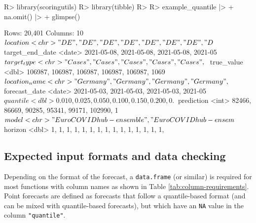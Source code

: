 \documentclass[
]{jss}
\begin{document}
\begin{CodeChunk}
\begin{CodeInput}
R> library(scoringutils)
R> library(tibble) 
R> 
R> example_quantile |>
+   na.omit() |>
+   glimpse()
\end{CodeInput}
\begin{CodeOutput}
Rows: 20,401
Columns: 10
$ location        <chr> "DE", "DE", "DE", "DE", "DE", "DE", "DE", "D~
$ target_end_date <date> 2021-05-08, 2021-05-08, 2021-05-08, 2021-05~
$ target_type     <chr> "Cases", "Cases", "Cases", "Cases", "Cases",~
$ true_value      <dbl> 106987, 106987, 106987, 106987, 106987, 1069~
$ location_name   <chr> "Germany", "Germany", "Germany", "Germany", ~
$ forecast_date   <date> 2021-05-03, 2021-05-03, 2021-05-03, 2021-05~
$ quantile        <dbl> 0.010, 0.025, 0.050, 0.100, 0.150, 0.200, 0.~
$ prediction      <int> 82466, 86669, 90285, 95341, 99171, 102990, 1~
$ model           <chr> "EuroCOVIDhub-ensemble", "EuroCOVIDhub-ensem~
$ horizon         <dbl> 1, 1, 1, 1, 1, 1, 1, 1, 1, 1, 1, 1, 1, 1, 1,~
\end{CodeOutput}
\end{CodeChunk}

\hypertarget{expected-input-formats-and-data-checking}{%
\subsection{Expected input formats and data
checking}\label{expected-input-formats-and-data-checking}}

Depending on the format of the forecast, a \texttt{data.frame} (or
similar) is required for most functions with column names as shown in
Table \ref{tab:column-requirements}. Point forecasts are defined as
forecasts that follow a quantile-based format (and can be mixed with
quantile-based forecasts), but which have an \texttt{NA} value in the
column \texttt{"quantile"}.
\end{document}
